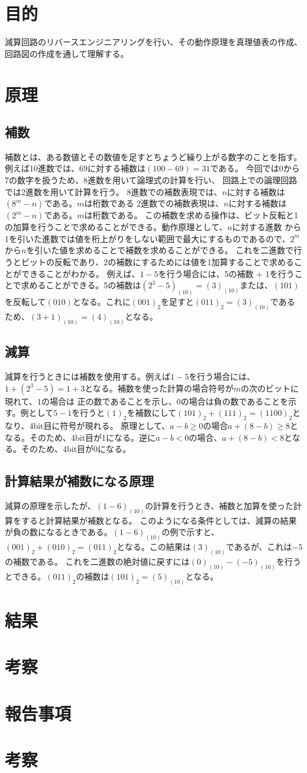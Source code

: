 \documentclass[a4paper,11pt]{ltjsarticle}
\begin{document}
\section{目的}
減算回路のリバースエンジニアリングを行い、その動作原理を真理値表の作成、回路図の作成を通して理解する。
\section{原理}
\subsection{補数}
補数とは、ある数値とその数値を足すとちょうど繰り上がる数字のことを指す。
例えば10進数では、$69$に対する補数は$(100 - 69) = 31$である。
今回では0から7の数字を扱うため、8進数を用いて論理式の計算を行い、
回路上での論理回路では2進数を用いて計算を行う。
8進数での補数表現では、$n$に対する補数は$(8^m - n)$である。$m$は桁数である
2進数での補数表現は、$n$に対する補数は$(2^m - n)$である。$m$は桁数である。
この補数を求める操作は、ビット反転と1の加算を行うことで求めることができる。動作原理として、$n$に対する進数
から1を引いた進数では値を桁上がりをしない範囲で最大にするものであるので、$2^m$から$n$を引いた値を求めることで補数を求めることができる。
これを二進数で行うとビットの反転であり、2の補数にするためには値を1加算することで求めることができることがわかる。
例えば、$1 - 5$を行う場合には、5の補数 + 1を行うことで求めることができる。5の補数は$(2^3 - 5)_(10)= (3)_(10)$または、$(101)$を反転して$(010)$となる。これに$(001)_2$を足すと$(011)_2 = (3)_(10)$であるため、$(3 + 1)_(10) = (4)_(10)$となる。
\subsection{減算}
減算を行うときには補数を使用する。例えば$1 - 5$を行う場合には、$1 + (2^3 - 5) = 1 + 3$となる。補数を使った計算の場合符号が$m$の次のビットに現れて、$1$の場合は
正の数であることを示し、$0$の場合は負の数であることを示す。例として$5 - 1$を行うと$(1)_2$を補数にして$ (101)_2 + (111)_2 = (1100)_2$となり、4bit目に符号が現れる。
原理として、$a - b \geq 0$の場合$ a + (8 - b) \geq 8$となる。そのため、4bit目が1になる。逆に$a - b < 0$の場合、$a + (8 - b) < 8$となる。そのため、4bit目が0になる。
\subsection{計算結果が補数になる原理}
減算の原理を示したが、$(1-6)_(10)$の計算を行うとき、補数と加算を使った計算をすると計算結果が補数となる。
このようになる条件としては、減算の結果が負の数になるときである。$(1 - 6)_(10)$の例で示すと、$(001)_2 + (010)_2 = (011)_2$となる。この結果は$(3)_(10)$であるが、これは$-5$の補数である。
これを二進数の絶対値に戻すには$(0)_(10) -(- 5)_(10)$を行うとできる。$(011)_2$の補数は$(101)_2 = (5)_(10)$となる。
\section{結果}
\section{考察}
\section{報告事項}
\section{考察}
\end{document}
